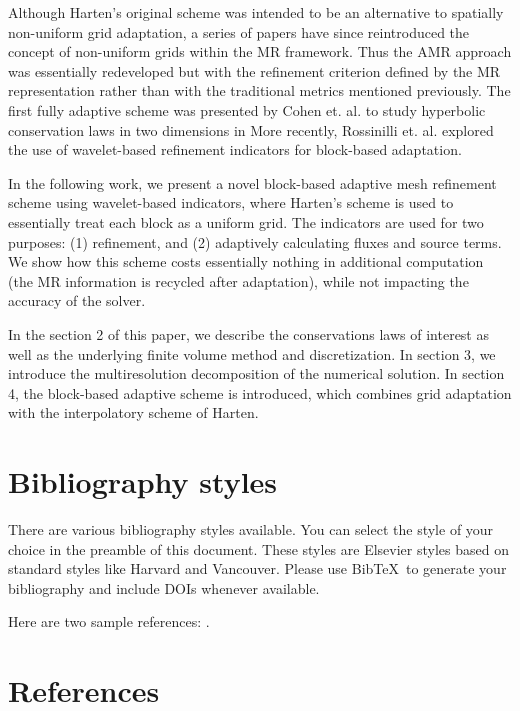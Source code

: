 \documentclass[review]{elsarticle}
\begin{document}
    Although Harten's original scheme was intended to be an alternative to
    spatially non-uniform grid adaptation, a series of papers have since
    reintroduced the concept of non-uniform grids within the MR framework. Thus
    the AMR approach was essentially redeveloped but with the refinement
    criterion defined by the MR representation rather than with the traditional
    metrics mentioned previously. The first fully adaptive scheme was presented
    by Cohen et. al. to study hyperbolic conservation laws in two dimensions in
    More recently, Rossinilli et. al. explored the use of
    wavelet-based refinement indicators for block-based adaptation.

    In the following work, we present a novel block-based adaptive mesh
    refinement scheme using wavelet-based indicators, where Harten's scheme is
    used to essentially treat each block as a uniform grid.  The indicators are
    used for two purposes: (1) refinement, and (2) adaptively calculating fluxes
    and source terms. We show how this scheme costs essentially nothing in
    additional computation (the MR information is recycled after adaptation),
    while not impacting the accuracy of the solver.

    In the section 2 of this paper, we describe the conservations laws of
    interest as well as the underlying finite volume method and discretization.
    In section 3, we introduce the multiresolution decomposition of the
    numerical solution. In section 4, the block-based adaptive scheme is
    introduced, which combines grid adaptation with the interpolatory scheme of
    Harten.

\section{Bibliography styles}

There are various bibliography styles available. You can select the style of your choice in the preamble of this document. These styles are Elsevier styles based on standard styles like Harvard and Vancouver. Please use Bib\TeX\ to generate your bibliography and include DOIs whenever available.

Here are two sample references: \cite{Feynman1963118,Dirac1953888}.

\section*{References}


\end{document}
